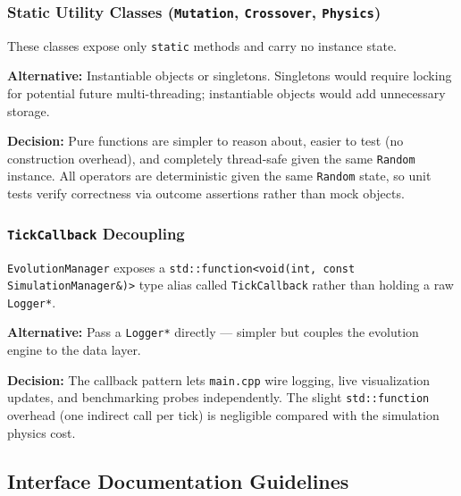 \subsubsection{Static Utility Classes (\texttt{Mutation}, \texttt{Crossover},
\texttt{Physics})}

These classes expose only \texttt{static} methods and carry no instance state.

\textbf{Alternative:} Instantiable objects or singletons.  Singletons would require
locking for potential future multi-threading; instantiable objects would add unnecessary
storage.

\textbf{Decision:} Pure functions are simpler to reason about, easier to test (no
construction overhead), and completely thread-safe given the same \texttt{Random}
instance.  All operators are deterministic given the same \texttt{Random} state, so unit
tests verify correctness via outcome assertions rather than mock objects.

\subsubsection{\texttt{TickCallback} Decoupling}

\texttt{EvolutionManager} exposes a
\texttt{std::function<void(int, const SimulationManager\&)>} type alias called
\texttt{TickCallback} rather than holding a raw \texttt{Logger*}.

\textbf{Alternative:} Pass a \texttt{Logger*} directly — simpler but couples the
evolution engine to the data layer.

\textbf{Decision:} The callback pattern lets \texttt{main.cpp} wire logging, live
visualization updates, and benchmarking probes independently.  The slight
\texttt{std::function} overhead (one indirect call per tick) is negligible compared with
the simulation physics cost.

\subsection{Interface Documentation Guidelines}
\label{sec:guidelines}

